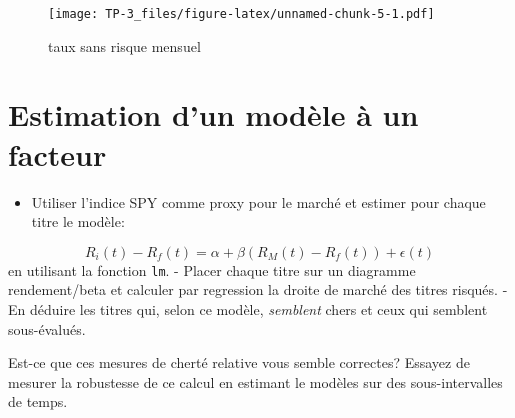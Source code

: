 \documentclass[
]{article}
\newenvironment{Shaded}{\begin{snugshade}}{\end{snugshade}}
\newcommand{\AttributeTok}[1]{\textcolor[rgb]{0.77,0.63,0.00}{#1}}
\newcommand{\ConstantTok}[1]{\textcolor[rgb]{0.00,0.00,0.00}{#1}}
\newcommand{\DecValTok}[1]{\textcolor[rgb]{0.00,0.00,0.81}{#1}}
\newcommand{\FloatTok}[1]{\textcolor[rgb]{0.00,0.00,0.81}{#1}}
\newcommand{\FunctionTok}[1]{\textcolor[rgb]{0.00,0.00,0.00}{#1}}
\newcommand{\NormalTok}[1]{#1}
\newcommand{\OtherTok}[1]{\textcolor[rgb]{0.56,0.35,0.01}{#1}}
\newcommand{\SpecialCharTok}[1]{\textcolor[rgb]{0.00,0.00,0.00}{#1}}
\newcommand{\StringTok}[1]{\textcolor[rgb]{0.31,0.60,0.02}{#1}}
\providecommand{\tightlist}{%
  \setlength{\itemsep}{0pt}\setlength{\parskip}{0pt}}
\begin{document}
\begin{Shaded}
\end{Shaded}

\begin{figure}
\centering
\texttt{[image: TP-3\_files/figure-latex/unnamed-chunk-5-1.pdf]}
\caption{taux sans risque mensuel}
\end{figure}

\hypertarget{estimation-dun-moduxe8le-uxe0-un-facteur}{%
\section{Estimation d'un modèle à un
facteur}\label{estimation-dun-moduxe8le-uxe0-un-facteur}}

\begin{itemize}
\tightlist
\item
  Utiliser l'indice SPY comme proxy pour le marché et estimer pour
  chaque titre le modèle:
\end{itemize}

\[
R_i(t) - R_f(t) = \alpha + \beta (R_M(t) - R_f(t)) + \epsilon(t)
\] en utilisant la fonction \texttt{lm}. - Placer chaque titre sur un
diagramme rendement/beta et calculer par regression la droite de marché
des titres risqués. - En déduire les titres qui, selon ce modèle,
\emph{semblent} chers et ceux qui semblent sous-évalués.

Est-ce que ces mesures de cherté relative vous semble correctes? Essayez
de mesurer la robustesse de ce calcul en estimant le modèles sur des
sous-intervalles de temps.
\end{document}
